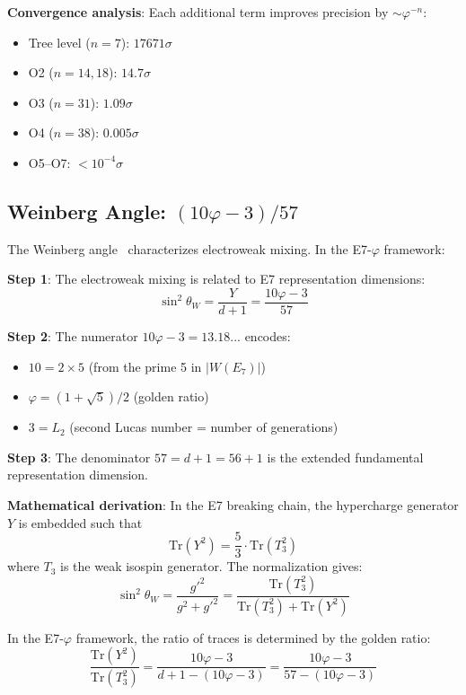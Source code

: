 \documentclass[11pt,a4paper]{article}
\begin{document}
\textbf{Convergence analysis}: Each additional term improves precision by $\sim \varphi^{-n}$:
\begin{itemize}
\item Tree level ($n=7$): $17671\sigma$
\item O2 ($n=14,18$): $14.7\sigma$
\item O3 ($n=31$): $1.09\sigma$
\item O4 ($n=38$): $0.005\sigma$
\item O5--O7: $< 10^{-4}\sigma$
\end{itemize}

\subsection{Weinberg Angle: $(10\varphi - 3)/57$}

The Weinberg angle~\cite{Weinberg1967,Glashow1961} characterizes electroweak mixing. In the E7-$\varphi$ framework:

\textbf{Step 1}: The electroweak mixing is related to E7 representation dimensions:
\begin{equation}
\sin^2\theta_W = \frac{Y}{d+1} = \frac{10\varphi - 3}{57}
\end{equation}

\textbf{Step 2}: The numerator $10\varphi - 3 = 13.18...$ encodes:
\begin{itemize}
\item $10 = 2 \times 5$ (from the prime 5 in $|W(E_7)|$)
\item $\varphi = (1+\sqrt{5})/2$ (golden ratio)
\item $3 = L_2$ (second Lucas number = number of generations)
\end{itemize}

\textbf{Step 3}: The denominator $57 = d + 1 = 56 + 1$ is the extended fundamental representation dimension.

\textbf{Mathematical derivation}: In the E7 breaking chain, the hypercharge generator $Y$ is embedded such that
\begin{equation}
\text{Tr}(Y^2) = \frac{5}{3} \cdot \text{Tr}(T_3^2)
\end{equation}
where $T_3$ is the weak isospin generator. The normalization gives:
\begin{equation}
\sin^2\theta_W = \frac{g'^2}{g^2 + g'^2} = \frac{\text{Tr}(T_3^2)}{\text{Tr}(T_3^2) + \text{Tr}(Y^2)}
\end{equation}

In the E7-$\varphi$ framework, the ratio of traces is determined by the golden ratio:
\begin{equation}
\frac{\text{Tr}(Y^2)}{\text{Tr}(T_3^2)} = \frac{10\varphi - 3}{d + 1 - (10\varphi - 3)} = \frac{10\varphi - 3}{57 - (10\varphi - 3)}
\end{equation}
\end{document}
